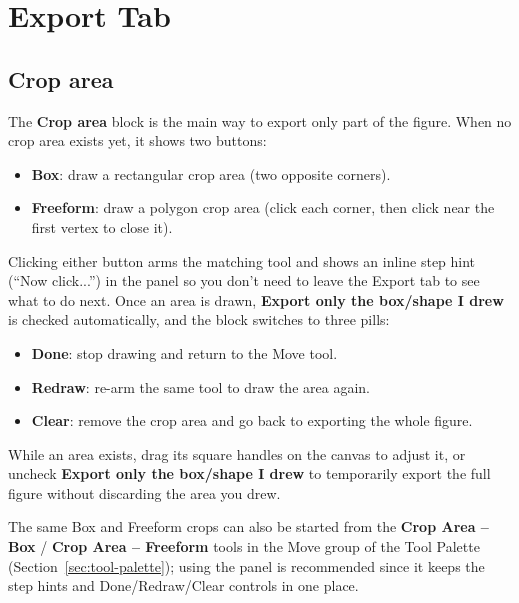 \documentclass[11pt,a4paper]{article}
\begin{document}
\section{Export Tab}
\subsection{Crop area}
The \textbf{Crop area} block is the main way to export only part of the figure. When no crop area exists yet, it shows two buttons:
\begin{itemize}[leftmargin=1.5em]
  \item \textbf{Box}: draw a rectangular crop area (two opposite corners).
  \item \textbf{Freeform}: draw a polygon crop area (click each corner, then click near the first vertex to close it).
\end{itemize}
Clicking either button arms the matching tool and shows an inline step hint (``Now click...'') in the panel so you don't need to leave the Export tab to see what to do next. Once an area is drawn, \textbf{Export only the box/shape I drew} is checked automatically, and the block switches to three pills:
\begin{itemize}[leftmargin=1.5em]
  \item \textbf{Done}: stop drawing and return to the Move tool.
  \item \textbf{Redraw}: re-arm the same tool to draw the area again.
  \item \textbf{Clear}: remove the crop area and go back to exporting the whole figure.
\end{itemize}
While an area exists, drag its square handles on the canvas to adjust it, or uncheck \textbf{Export only the box/shape I drew} to temporarily export the full figure without discarding the area you drew.

The same Box and Freeform crops can also be started from the \textbf{Crop Area -- Box} / \textbf{Crop Area -- Freeform} tools in the Move group of the Tool Palette (Section~\ref{sec:tool-palette}); using the panel is recommended since it keeps the step hints and Done/Redraw/Clear controls in one place.
\end{document}
